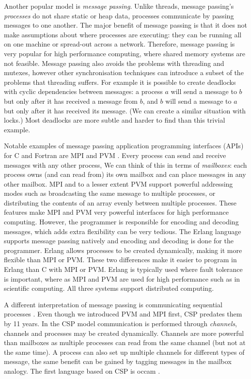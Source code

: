 Another popular model is \emph{message passing}.
Unlike threads, message passing's \emph{processes} do not share static or heap
data,
processes communicate by passing messages to one another.
The major benefit of message passing is that it does not make assumptions about where processes
are executing:
they can be running all on one machine or spread-out across a network.
Therefore, message passing is very popular for high performance computing,
where shared memory systems are not feasible.
Message passing also avoids the problems with threading and mutexes,
however other synchronisation techniques can introduce a subset of the
problems that threading suffers.
For example it is possible to create deadlocks with cyclic dependencies
between messages:
a process $a$ will send a message to $b$ but only after it has received a
message from $b$,
and $b$ will send a message to $a$ but only after it has received its message.
(We can create a similar situation with locks.)
Most deadlocks are more subtle and harder to find than this trivial example.

Notable examples of message passing application programming interfaces (APIs)
for C and Fortran \citep{backus:1957:fortran} are
MPI \citep{mpi} and PVM \citep{pvm}.
Every process can send and receive messages with any other process,
We can think of this in terms of \emph{mailboxes}:
each process owns (and can read from) its own mailbox and can place messages
in any other mailbox.
MPI and to a lesser extent PVM support powerful addressing modes
such as broadcasting the same message to multiple processes, or
distributing the contents of an array evenly between
multiple processes.
These features make MPI and PVM very powerful interfaces for high performance
computing.
However, the programmer is responsible for encoding and decoding messages,
which adds extra flexibility can be very tedious.
The Erlang language \citep{erlang} supports message passing natively and
encoding and decoding is done for the programmer.
Erlang allows processes to be created dynamically,
making it more flexible than MPI or PVM.
These two differences make it easier to program in Erlang than C with MPI or
PVM.
Erlang is typically used where fault tolerance is important,
where as MPI and PVM are used for high performance such as in scientific
computing.
All three systems support distributed computing.

A different interpretation of message passing is
communicating sequential processes \citep{hoare:1978:csp}.
Even though we introduced PVM and MPI first, CSP predates them by 11 years.
In the CSP model communication is performed through \emph{channels},
channels and processes may be created dynamically.
Channels are more powerful than mailboxes as multiple processes can read from
the same channel (but not at the same time).
A process can also set up multiple channels for different types of message,
the same benefit can be gained by tagging messages in the mailbox analogy.
The first language based on CSP is occam \citep{occam1, occam3}.

